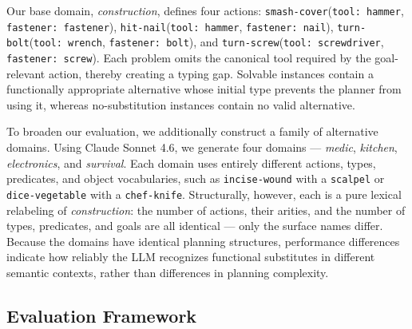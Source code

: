 Our base domain, \emph{construction}, defines four actions: \texttt{smash-cover}(\texttt{tool: hammer}, \texttt{fastener: fastener}), \texttt{hit-nail}(\texttt{tool: hammer}, \texttt{fastener: nail}), \texttt{turn-bolt}(\texttt{tool: wrench}, \texttt{fastener: bolt}), and \texttt{turn-screw}(\texttt{tool: screwdriver}, \texttt{fastener: screw}). Each problem omits the canonical tool required by the goal-relevant action, thereby creating a typing gap. Solvable instances contain a functionally appropriate alternative whose initial type prevents the planner from using it, whereas no-substitution instances contain no valid alternative.

To broaden our evaluation, we additionally construct a family of alternative domains. Using Claude Sonnet 4.6, we generate four domains --- \emph{medic}, \emph{kitchen}, \emph{electronics}, and \emph{survival}. Each domain uses entirely different actions, types, predicates, and object vocabularies, such as \texttt{incise-wound} with a \texttt{scalpel} or \texttt{dice-vegetable} with a \texttt{chef-knife}. Structurally, however, each is a
pure lexical relabeling of \emph{construction}: the number of actions, their arities, and the number of types, predicates, and goals are all identical --- only the surface names differ. Because the domains have identical planning structures, performance differences indicate how reliably the LLM recognizes functional substitutes in different semantic contexts, rather than differences in planning complexity.




\subsection{Evaluation Framework}
\label{subsec:eval_framework}

